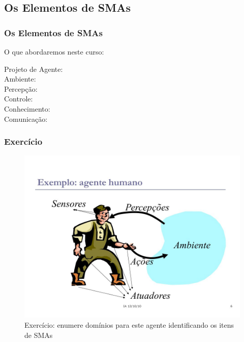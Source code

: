 
\subsection{Os Elementos de SMAs}

\begin{frame}%

 \frametitle{Os Elementos de SMAs}
  
  \begin{block}{O que abordaremos neste curso:}
  
   \begin{description}
  
     \item[Projeto de Agente:] 
     
    \item[Ambiente:] 
          
   \item[Percepção:]
               
 \item[Controle:]
                    
  \item[Conhecimento:]
                          
  \item[Comunicação:]
          
   \end{description}
  \end{block}    
   
\end{frame}







\begin{frame}

\frametitle{Exercício}
   
\begin{figure}[!ht]
\centering
\includegraphics[height =.56\textheight,width=.7\textwidth]{figuras/agente_humano.jpg}
\caption{Exercício: enumere domínios para este agente identificando os itens de SMAs}
\end{figure}

   
\end{frame}



